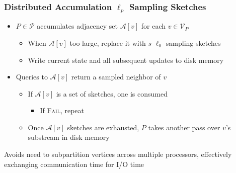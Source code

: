 \documentclass{beamer}
\newcommand{\algoname}[1]{\textnormal{\textsc{#1}}}
\begin{document}
\begin{frame}
\frametitle{Distributed Accumulation $\ell_p$ Sampling Sketches}

\begin{itemize}
	\item $P \in \mathcal{P}$ accumulates adjacency set $\mathcal{A}[v]$ for each $v \in \mathcal{V}_P$ %
	\begin{itemize}
		\item When $\mathcal{A}[v]$ too large, replace it with $s$ $\ell_0$ sampling sketches
		\item Write current state and all subsequent updates to disk memory %
	\end{itemize}
	\item Queries to $\mathcal{A}[v]$ return a sampled neighbor of $v$
	\begin{itemize}
		\item If $\mathcal{A}[v]$ is a set of sketches, one is consumed
		\begin{itemize}
			\item If \algoname{Fail}, repeat		
		\end{itemize}
		\item Once $\mathcal{A}[v]$ sketches are exhausted, $P$ takes another pass over $v$'s substream in disk memory
	\end{itemize}
\end{itemize}

\begin{block}{}
\begin{center}
Avoids need to subpartition vertices across multiple processors, effectively exchanging communication time for I/O time
\end{center}
\end{block}

\end{frame}

\end{document}
